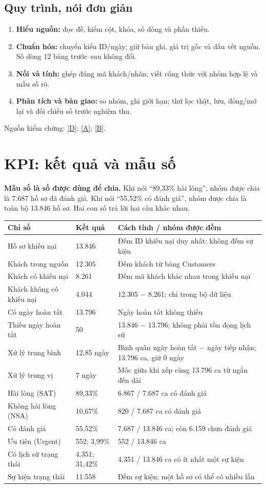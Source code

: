 \documentclass[11pt,a4paper]{article}
\newcommand{\lead}[1]{\begingroup\setlength{\fboxsep}{10pt}\colorbox{mist}{\parbox{\dimexpr\linewidth-20pt\relax}{\color{navy}#1}}\endgroup\par}
\newcommand{\evidence}[1]{{\small\color{muted}Nguồn kiểm chứng: #1.}\par}
\newcommand{\src}[2]{\hyperlink{source-index}{[#2]}}
\begin{document}
\subsection*{Quy trình, nói đơn giản}
\begin{enumerate}
\item \textbf{Hiểu nguồn:} đọc đề, kiểm cột, khóa, số dòng và phần thiếu.
\item \textbf{Chuẩn hóa:} chuyển kiểu ID/ngày; giữ bản ghi, giá trị gốc và dấu vết nguồn. Số dòng 12 bảng trước–sau không đổi.
\item \textbf{Nối và tính:} ghép đúng mã khách/nhãn; viết công thức với nhóm hợp lệ và mẫu số rõ.
\item \textbf{Phân tích và bàn giao:} so nhóm, ghi giới hạn; thử lọc thật, lưu, đóng/mở lại và đối chiếu số trước nghiệm thu.
\end{enumerate}
\evidence{\src{source-data}{D}; \src{source-analysis}{A}; \src{source-qa}{B}}
\clearpage

\section{KPI: kết quả và mẫu số}
\lead{\textbf{Mẫu số là số được dùng để chia.} Khi nói “89,33\% hài lòng”, nhóm được chia là 7.687 hồ sơ đã đánh giá. Khi nói “55,52\% có đánh giá”, nhóm được chia là toàn bộ 13.846 hồ sơ. Hai con số trả lời hai câu khác nhau.}
\vspace{3mm}
{\small
\begin{tabularx}{\linewidth}{@{}L{3.8cm}L{2.7cm}Y@{}}
\toprule
\textbf{Chỉ số} & \textbf{Kết quả} & \textbf{Cách tính / nhóm được đếm}\\
\midrule
Hồ sơ khiếu nại & 13.846 & Đếm ID khiếu nại duy nhất; không đếm sự kiện\\
Khách trong nguồn & 12.305 & Đếm khách từ bảng Customers\\
Khách có khiếu nại & 8.261 & Đếm mã khách khác nhau trong khiếu nại\\
Khách không có khiếu nại & 4.044 & 12.305 − 8.261; chỉ trong bộ dữ liệu\\
Có ngày hoàn tất & 13.796 & Ngày hoàn tất không thiếu\\
Thiếu ngày hoàn tất & 50 & 13.846 − 13.796; không phải tồn đọng lịch sử\\
Xử lý trung bình & 12,85 ngày & Bình quân ngày hoàn tất − ngày tiếp nhận; 13.796 ca, giữ 0 ngày\\
Xử lý trung vị & 7 ngày & Mốc giữa khi xếp cùng 13.796 ca từ ngắn đến dài\\
Hài lòng (SAT) & 89,33\% & 6.867 / 7.687 ca có đánh giá\\
Không hài lòng (NSA) & 10,67\% & 820 / 7.687 ca có đánh giá\\
Có đánh giá & 55,52\% & 7.687 / 13.846 ca; còn 6.159 chưa đánh giá\\
Ưu tiên (Urgent) & 552; 3,99\% & 552 / 13.846 ca\\
Có lịch sử trạng thái & 4.351; 31,42\% & 4.351 / 13.846 ca có ít nhất một sự kiện\\
Sự kiện trạng thái & 11.558 & Đếm sự kiện; một hồ sơ có thể có nhiều lần\\
\bottomrule
\end{tabularx}}
\end{document}

